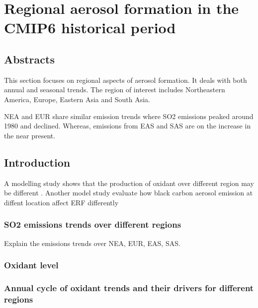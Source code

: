 \chapter{Regional aerosol formation in the CMIP6 historical period}
\ifpdf
    \graphicspath{{Chapter5/Figs/Raster/}{Chapter3/Figs/PDF/}{Chapter5/Figs/}}
\else
    \graphicspath{{Chapter5/Figs/Vector/}{Chapter5/Figs/}}
\fi


\section*{Abstracts}
This section focuses on regional aspects of aerosol formation. It deals with both annual and seasonal trends. The region of interest includes Northeastern America, Europe, Eastern Asia and South Asia.

NEA and EUR share similar emission trends where SO2 emissions peaked around 1980 and declined. Whereas, emissions from EAS and SAS are on the increase in the near present. 

\section{Introduction}
A modelling study shows that the production of oxidant over different region may be different \cite{zhangTroposphericOzoneChange2016}. Another model study evaluate how black carbon aerosol emission at diffent location affect ERF differently 

\subsection{SO2 emissions trends over different regions}

Explain the emissions trends over NEA, EUR, EAS, SAS. 

\subsection{Oxidant level}

\subsection{Annual cycle of oxidant trends and their drivers for different regions}


